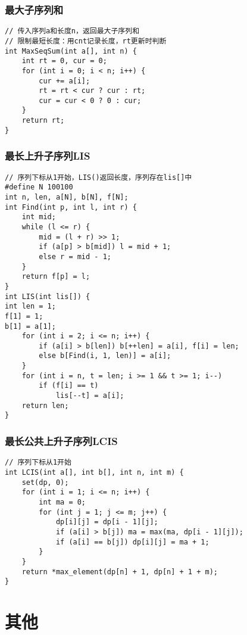\documentclass[a4paper]{article}
\begin{document}
\subsubsection{最大子序列和}
\begin{lstlisting}
// 传入序列a和长度n，返回最大子序列和
// 限制最短长度：用cnt记录长度，rt更新时判断
int MaxSeqSum(int a[], int n) {
	int rt = 0, cur = 0;
	for (int i = 0; i < n; i++) {
		cur += a[i];
		rt = rt < cur ? cur : rt;
		cur = cur < 0 ? 0 : cur;
	}
	return rt;
}
\end{lstlisting}
\subsubsection{最长上升子序列LIS}
\begin{lstlisting}
// 序列下标从1开始，LIS()返回长度，序列存在lis[]中
#define N 100100
int n, len, a[N], b[N], f[N];
int Find(int p, int l, int r) {
    int mid;
    while (l <= r) {
        mid = (l + r) >> 1;
        if (a[p] > b[mid]) l = mid + 1;
        else r = mid - 1;
    }
    return f[p] = l;
}
int LIS(int lis[]) {
int len = 1;
f[1] = 1;
b[1] = a[1];
    for (int i = 2; i <= n; i++) {
        if (a[i] > b[len]) b[++len] = a[i], f[i] = len;
        else b[Find(i, 1, len)] = a[i];
    }
    for (int i = n, t = len; i >= 1 && t >= 1; i--)
        if (f[i] == t)
            lis[--t] = a[i];
    return len;
}
\end{lstlisting}
\subsubsection{最长公共上升子序列LCIS}
\begin{lstlisting}
// 序列下标从1开始
int LCIS(int a[], int b[], int n, int m) {
	set(dp, 0);
	for (int i = 1; i <= n; i++) {
		int ma = 0;
		for (int j = 1; j <= m; j++) {
			dp[i][j] = dp[i - 1][j];
			if (a[i] > b[j]) ma = max(ma, dp[i - 1][j]);
			if (a[i] == b[j]) dp[i][j] = ma + 1;
		}
	}
	return *max_element(dp[n] + 1, dp[n] + 1 + m);
}
\end{lstlisting}
\clearpage
\section{其他}
\end{document}
